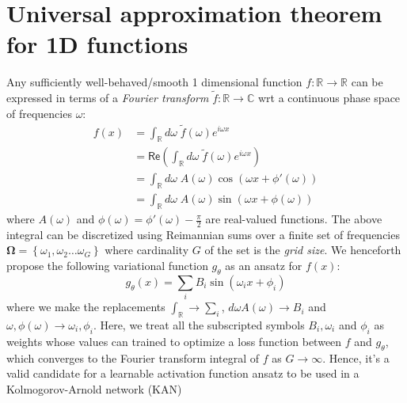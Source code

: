 \section{Universal approximation theorem for 1D functions}

Any sufficiently well-behaved/smooth 1 dimensional function $f:\mathbb{R}\to\mathbb{R}$
can be expressed in terms of a \emph{Fourier transform} $\tilde{f}:\mathbb{R}\to\mathbb{C}$
wrt a continuous phase space of frequencies $\omega$:
\begin{align*}
f(x) & =\int_{\mathbb{R}}d\omega\;\tilde{f}(\omega)e^{i\omega x}\\
 & =\mathsf{Re}\left(\int_{\mathbb{R}}d\omega\;\tilde{f}(\omega)e^{i\omega x}\right)\\
 & =\int_{\mathbb{R}}d\omega\;A(\omega)\cos\left(\omega x+\phi'(\omega)\right)\\
 & =\int_{\mathbb{R}}d\omega\;A(\omega)\sin\left(\omega x+\phi(\omega)\right)
\end{align*}
where $A(\omega)$ and $\phi(\omega)=\phi'(\omega)-\frac{\pi}{2}$
are real-valued functions. The above integral can be discretized using
Reimannian sums over a finite set of frequencies $\bm{\Omega}=\left\{ \omega_{1},\omega_{2}\dots\omega_{G}\right\} $
where cardinality $G$ of the set is the \emph{grid size}. We henceforth
propose the following variational function $g_{\theta}$ as an ansatz
for $f(x)$:
\[
g_{\theta}(x)=\sum_{i}B_{i}\sin\left(\omega_{i}x+\phi_{i}\right)
\]
where we make the replacements $\int_{\mathbb{R}}\to\sum_{i}$, $d\omega A(\omega)\to B_{i}$
and $\omega,\phi(\omega)\to\omega_{i},\phi_{i}$. Here, we treat all
the subscripted symbols $B_{i},\omega_{i}$ and $\phi_{i}$ as weights
whose values can trained to optimize a loss function between $f$
and $g_{\theta}$, which converges to the Fourier transform integral
of $f$ as $G\to\infty$. Hence, it's a valid candidate for a learnable
activation function ansatz to be used in a Kolmogorov-Arnold network
(KAN)
